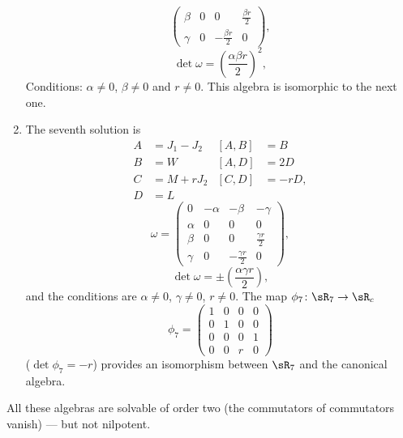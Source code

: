 \begin{enumerate}
\begin{equation}
\begin{pmatrix}
			      \beta  & 0       & 0                    & \frac{ \beta r }{2} \\
			      \gamma & 0       & -\frac{ \beta r }{2} & 0
		      \end{pmatrix},
	      \end{equation}
	      \begin{equation}
		      \det\omega=\left( \frac{ \alpha\beta r }{ 2 } \right)^2,
	      \end{equation}
	      Conditions: $\alpha\neq 0$, $\beta\neq 0$ and $r\neq 0$. This algebra is isomorphic to the next one.
	\item The seventh solution is
	      \begin{align*}
		      A & =J_{1}-J_{2} & [A,B] & =B    \\
		      B & =W           & [A,D] & =2D   \\
		      C & =M+rJ_{2}    & [C,D] & =-rD, \\
		      D & =L
	      \end{align*}
	      \begin{equation}
		      \omega=\begin{pmatrix}
			      0      & -\alpha & -\beta                & -\gamma              \\
			      \alpha & 0       & 0                     & 0                    \\
			      \beta  & 0       & 0                     & \frac{ \gamma r }{2} \\
			      \gamma & 0       & -\frac{ \gamma r }{2} & 0
		      \end{pmatrix},
	      \end{equation}
	      \begin{equation}
		      \det\omega=\pm\left( \frac{ \alpha\gamma r }{ 2 } \right),
	      \end{equation}
	      and the conditions are $\alpha\neq 0$, $\gamma\neq 0$, $r\neq 0$.  The map $\phi_7\colon \sR_7\to \sR_c$
	      \[
		      \phi_{7}=
		      \begin{pmatrix}
			      1 & 0 & 0 & 0 \\
			      0 & 1 & 0 & 0 \\
			      0 & 0 & 0 & 1 \\
			      0 & 0 & r & 0
		      \end{pmatrix}
	      \]
	      ($\det\phi_{7}=-r$) provides an isomorphism between $\sR_{7}$ and the canonical algebra.
\end{enumerate}
\let\ANCtheenumi\theenumi
All these algebras are solvable of order two (the commutators of commutators vanish) --- but not nilpotent.

